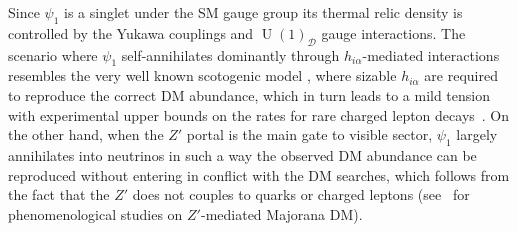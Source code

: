 \documentclass[12pt]{article}
\begin{document}
Since $\psi_{1}$ is a singlet under the SM gauge group its thermal relic density is controlled by the Yukawa couplings and $\operatorname{U}(1)_{\mathcal{D}}$ gauge interactions. 
The scenario where $\psi_{1}$ self-annihilates dominantly through $h_{i\alpha}$-mediated interactions resembles the very well known scotogenic model \cite{Ma:2006km},  
where sizable $h_{i\alpha}$ are required to reproduce the correct DM abundance, which in turn leads to a mild tension with experimental upper bounds on the rates for rare charged lepton decays~\cite{Kubo:2006yx,Sierra:2008wj,Ibarra:2016dlb}. 
On the other hand, when the $Z'$ portal \cite{Langacker:2008yv,Arcadi:2013qia} is the main gate to visible sector, $\psi_1$ largely annihilates into neutrinos in such a way the observed DM abundance can be reproduced without entering in conflict with the DM searches, which follows from the fact that the $Z'$ does not couples to quarks or charged leptons
(see~\cite{Arcadi:2013qia,Alves:2013tqa,Alves:2015pea,Alves:2016cqf,Blanco:2019hah} for phenomenological studies on $Z'$-mediated Majorana DM). 


\end{document}

